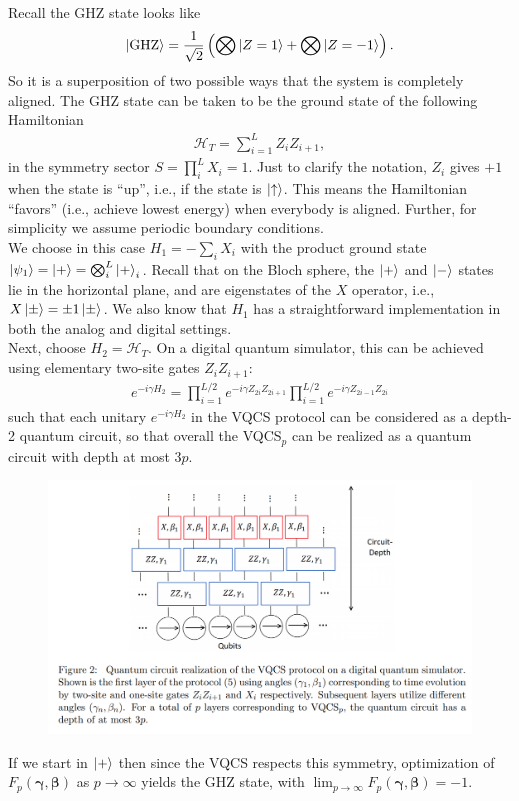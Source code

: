 \documentclass{book}
\theoremstyle{definition}
\newcommand{\had}{\mathcal{H}}
\newcommand{\f}[2]{\frac{#1}{#2}}
\newcommand{\lp}{\left(}
\newcommand{\rp}{\right)}
\begin{document}
Recall the GHZ state looks like
\begin{align}
\ket{\text{GHZ}} = \f{1}{\sqrt{2}}\lp \bigotimes \ket{Z=1} + \bigotimes \ket{Z = -1} \rp.
\end{align} 
So it is a superposition of two possible ways that the system is completely aligned. The GHZ state can be taken to be the ground state of the following Hamiltonian
\begin{align}
\had_T = \sum^L_{i=1}Z_i Z_{i+1},
\end{align}
in the symmetry sector $S = \prod^L_{i}X_i =1$. Just to clarify the notation, $Z_i$ gives $+1$ when the state is ``up'', i.e., if the state is $\ket{\uparrow}$. This means the Hamiltonian ``favors'' (i.e., achieve lowest energy) when everybody is aligned. Further, for simplicity we assume periodic boundary conditions.\\

We choose in this case $H_1 = -\sum_i X_i$ with the product ground state $\ket{\psi_1} = \ket{+} = \bigotimes^L_{i}\ket{+}_i$. Recall that on the Bloch sphere, the $\ket{+}$ and $\ket{-}$ states lie in the horizontal plane, and are eigenstates of the $X$ operator, i.e., $X\ket{\pm} = \pm 1 \ket{\pm}$. We also know that $H_1$ has a straightforward implementation in both the analog and digital settings. \\

Next, choose $H_2 = \had_T$. On a digital quantum simulator, this can be achieved using elementary two-site gates $Z_i Z_{i+1}$: 
\begin{align}
e^{-i\gamma H_2} = \prod^{L/2}_{i=1} e^{-i\gamma Z_{2i}Z_{2i+1}}   \prod^{L/2}_{i=1} e^{-i\gamma Z_{2i-1}Z_{2i}}
\end{align}
such that each unitary $e^{-i\gamma H_2}$ in the VQCS protocol can be considered as a depth-2 quantum circuit, so that overall the VQCS$_p$ can be realized as a quantum circuit with depth at most $3p$. 
\begin{figure}[!htb]
	\centering
	\includegraphics[scale=0.3]{vqcs}
\end{figure}
If we start in $\ket{+}$ then since the VQCS respects this symmetry, optimization of $F_p(\bm\gamma,\bm\beta)$ as $p\to \infty$ yields the GHZ state, with $\lim_{p\to \infty} F_p(\bm\gamma,\bm\beta) = -1$. \\
\end{document}
